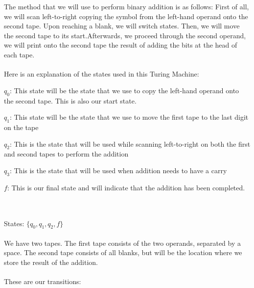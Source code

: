 \documentclass{article}%
\begin{document}
The method that we will use to perform binary addition is as follows: First of all, we will scan left-to-right copying the symbol from the left-hand operand
onto the second tape. Upon reaching a blank, we will switch states. Then, we will move the second tape to its start.Afterwards, we proceed through the second
operand, we will print onto the second tape the result of
adding the bits at the head of each tape.\\
\\
Here is an explanation of the states used in this Turing Machine:
\begin{itemize}
        \begin{item}
            $q_0$: This state will be the state that we use to copy the left-hand operand onto the second tape. This is also our start state.
        \end{item}

        \begin{item}
            $q_1$: This state will be the state that we use to move the first tape to the last digit on the tape
        \end{item}

        \begin{item}
            $q_2$: This is the state that will be used while scanning left-to-right on both the first and second tapes to perform the addition
        \end{item}

        \begin{item}
            $q_3$: This is the state that will be used when addition needs to have a carry
        \end{item}

        \begin{item}
            $f$: This is our final state and will indicate that the addition has been completed.
        \end{item}
\end{itemize}\\
\\
States: $\{q_0, q_1, q_2, f\}$\\
\\
We have two tapes. The first tape consists of the two operands, separated by a space. The second tape consists of all blanks, but will be the location where
we store the result of the addition.\\
\\
These are our transitions:\\
\\
\end{document}
